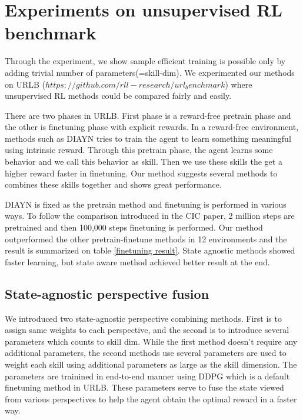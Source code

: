 \section{Experiments on unsupervised RL benchmark}

Through the experiment, we show sample efficient training is possible only by adding trivial number of parameters(=skill-dim).
We experimented our methods on URLB ($https://github.com/rll-research/url_benchmark$) where unsupervised RL methods could be compared fairly and easily.

There are two phases in URLB.
First phase is a reward-free pretrain phase and the other is finetuning phase with explicit rewards.
In a reward-free environment, methods such as DIAYN tries to train the agent to learn something meaningful using intrinsic reward.
Through this pretrain phase, the agent learns some behavior and we call this behavior as skill.
Then we use these skills the get a higher reward faster in finetuning. Our method suggests several methods to combines these skills together and shows great performance.

DIAYN is fixed as the pretrain method and finetuning is performed in various ways.
To follow the comparison introduced in the CIC paper, 2 million steps are pretrained and then 100,000 steps finetuning is performed.
Our method outperformed the other pretrain-finetune methods in 12 environments and the result is summarized on table \cref{finetuning result}.
State agnostic methods showed faster learning, but state aware method achieved better result at the end.



\subsection{State-agnostic perspective fusion}
We introduced two state-agnostic perspective combining methods.
First is to assign same weights to each perspective, and the second is to introduce several parameters which counts to skill dim.
While the first method doesn't require any additional parameters, the second methods use several parameters are used to weight each skill using additional parameters as large as the skill dimension.
The parameters are trainined in end-to-end manner using DDPG which is a default finetuning method in URLB.
These parameters serve to fuse the state viewed from various perspectives to help the agent obtain the optimal reward in a faster way.

